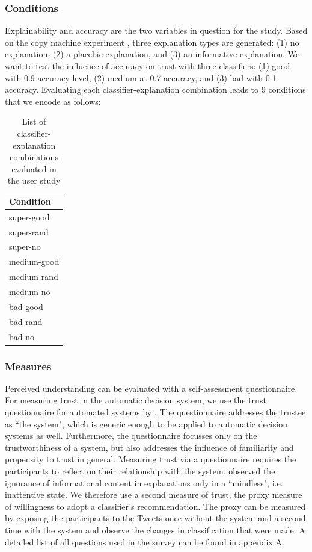 \subsubsection{Conditions}
Explainability and accuracy are the two variables in question for the study. Based on the copy machine experiment \cite{langer1978mindlessness}, three explanation types are generated: (1) no explanation, (2) a placebic explanation, and (3) an informative explanation. We want to test the influence of accuracy on trust with three classifiers: (1) good with 0.9 accuracy level, (2) medium at 0.7 accuracy, and (3) bad with 0.1 accuracy. Evaluating each classifier-explanation combination leads to 9 conditions that we encode as follows:
\begin{table}[H]
	\centering
	\begin{tabular}{l}
		\textbf{Condition}\\ \midrule
		super-good\\
		super-rand\\
		super-no\\
		medium-good\\
		medium-rand\\
		medium-no\\
		bad-good\\
		bad-rand\\
		bad-no\\ \bottomrule
	\end{tabular}
	\caption{List of classifier-explanation combinations evaluated in the user study}
	\label{tab:conditions}
\end{table} 

\subsubsection{Measures}
Perceived understanding can be evaluated with a self-assessment questionnaire.\newline
For measuring trust in the automatic decision system, we use the trust questionnaire for automated systems by \cite{ruping2006learning}. The questionnaire addresses the trustee as ``the system", which is generic enough to be applied to automatic decision systems as well. Furthermore, the questionnaire focusses only on the trustworthiness of a system, but also addresses the influence of familiarity and propensity to trust in general. Measuring trust via a questionnaire requires the participants to reflect on their relationship with the system. \cite{langer1978mindlessness} observed the ignorance of informational content in explanations only in a ``mindless", i.e. inattentive state. We therefore use a second measure of trust, the proxy measure of willingness to adopt a classifier's recommendation. The proxy can be measured by exposing the participants to the Tweets once without the system and a second time with the system and observe the changes in classification that were made. A detailed list of all questions used in the survey can be found in appendix A.

